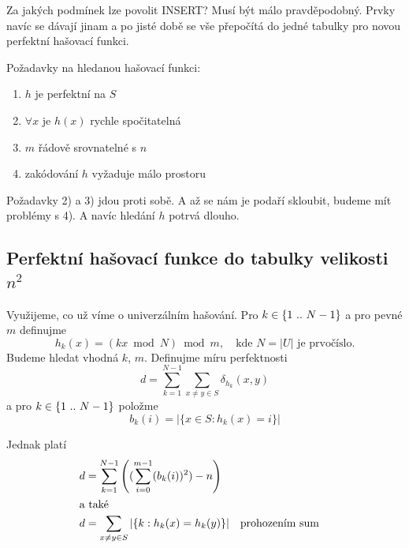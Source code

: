 Za jakých podmínek lze povolit INSERT? Musí být málo
pravděpodobný. Prvky navíc se dávají jinam a po jisté době se vše
přepočítá do jedné tabulky pro novou perfektní hašovací funkci.

\begin{samepage}
Požadavky na hledanou hašovací funkci:
\begin{enumerate}
  \item $h$ je perfektní na $S$
  \item $\forall x$ je $h(x)$ rychle spočitatelná
  \item $m$ řádově srovnatelné s $n$
  \item zakódování $h$ vyžaduje málo prostoru
\end{enumerate}
\end{samepage}

Požadavky 2) a 3) jdou proti sobě. A až se nám je podaří skloubit,
budeme mít problémy s 4). A navíc hledání $h$ potrvá dlouho.

\subsection{Perfektní hašovací funkce do tabulky velikosti $n^2$}

Využijeme, co už víme o univerzálním hašování. Pro $k \in \{{1}\ ..\ {N-1}\}$ 
a pro pevné $m$ definujme 
\begin{equation}
h_k(x) = ( kx \bmod N ) \bmod m, \quad\text{kde $N=|U|$ je prvočíslo.}
\end{equation}
Budeme hledat vhodná $k$, $m$.
Definujme míru perfektnosti
\begin{equation}
d = \sum_{k=1}^{N-1} \sum_{x \neq y \in S} \delta_{h_k}(x,y)
\end{equation}
a pro $k \in \{{1}\ ..\ {N-1}\}$ položme
\begin{equation}
b_k(i) = |\{ x \in S : h_k(x) = i \}|
\end{equation}

Jednak platí
\begin{align}
\label{bki2}
d & = \sum_{k=1}^{N-1} \left( ( \sum_{i=0}^{m-1} ( b_k(i) )^2 ) -n \right)\\
\intertext{a také}
d & = \sum_{x \neq y \in S} |\{ k : h_k(x)=h_k(y) \}|
	&&\text{prohozením sum}\\
\end{align}

